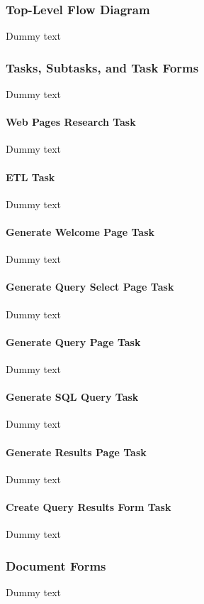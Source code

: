 \documentclass{article}
\begin{document}
\subsubsection{Top-Level Flow Diagram}
Dummy text

\subsubsection{Tasks, Subtasks, and Task Forms}
Dummy text
\paragraph{Web Pages Research Task\\}
Dummy text
\paragraph{ETL Task\\}
Dummy text
\paragraph{Generate Welcome Page Task\\}
Dummy text
\paragraph{Generate Query Select Page Task\\}
Dummy text
\paragraph{Generate Query Page Task\\}
Dummy text
\paragraph{Generate SQL Query Task\\}
Dummy text
\paragraph{Generate Results Page Task\\}
Dummy text
\paragraph{Create Query Results Form Task\\}
Dummy text

\subsubsection{Document Forms}
Dummy text
\end{document}
